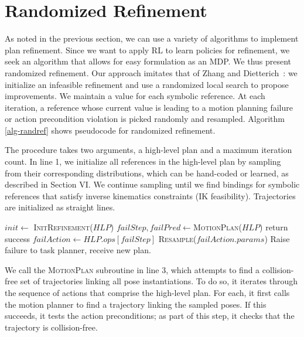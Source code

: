 \section{Randomized Refinement}
As noted in the previous section, we can use a variety of algorithms to implement
plan refinement. Since we want to apply RL to learn policies for refinement,
we seek an algorithm that allows for easy formulation as an MDP. We thus present
randomized refinement. Our approach imitates that of Zhang and Dietterich~\cite{JobShopSched}:
we initialize an infeasible refinement and use a randomized local search to propose
improvements. We maintain a value for each symbolic reference.
At each iteration, a reference whose current value is leading to a motion planning failure or
action precondition violation is picked randomly and resampled.
Algorithm \ref{alg-randref} shows pseudocode for randomized refinement.

The procedure takes two arguments, a high-level plan and a maximum
iteration count. In line 1, we initialize all references in the high-level plan by sampling
from their corresponding distributions, which can be hand-coded or learned, as described in Section VI. We continue sampling
until we find bindings for symbolic references that satisfy
inverse kinematics constraints (IK feasibility). Trajectories are
initialized as straight lines.

\begin{algorithm}[t]
\begin{small}
  \SetAlgoLined
  \DontPrintSemicolon
   {
  \nl $init \leftarrow$ \textsc{InitRefinement}($HLP$)\;
  \nl {} {
  \nl $failStep, failPred \leftarrow $\textsc{MotionPlan}($HLP$)\;
  \nl {} {
  \nl return success }
  \nl {} {
  \nl $failAction \leftarrow HLP.ops[failStep]$\;
  \nl \textsc{Resample}($failAction.params$) }
  \nl {} }
  \nl Raise failure to task planner, receive new plan. }
\end{small}
\label{alg-randref}
\vspace{-1.5 em}
\end{algorithm}

We call the \textsc{MotionPlan} subroutine in line 3, which attempts to
find a collision-free set of trajectories linking all pose instantiations.
To do so, it iterates through the sequence of actions that comprise the high-level plan.
For each, it first calls the motion planner to find a trajectory
linking the sampled poses. If this succeeds, it tests the action preconditions;
as part of this step, it checks that the trajectory is collision-free.

